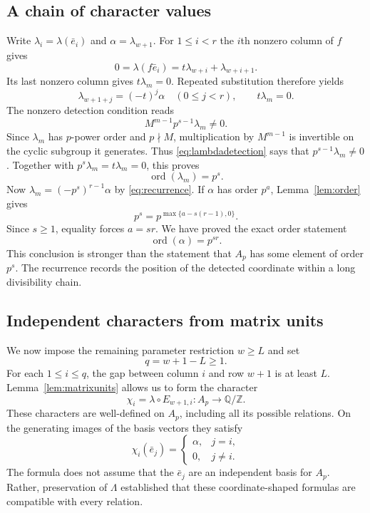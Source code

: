 \documentclass[11pt]{article}
\numberwithin{equation}{section}
\theoremstyle{definition}
\theoremstyle{remark}
\newcommand{\Z}{\mathbb Z}
\newcommand{\Q}{\mathbb Q}
\newcommand{\ord}{\operatorname{ord}}
\begin{document}
\subsection{A chain of character values}
Write $\lambda_i=\lambda(\bar e_i)$ and $\alpha=\lambda_{w+1}$. For $1\le i<r$ the $i$th nonzero column of $f$ gives
\[
0=\lambda(f\bar e_i)=t\lambda_{w+i}+\lambda_{w+i+1}.
\]
Its last nonzero column gives $t\lambda_m=0$. Repeated substitution therefore yields
\begin{equation}\label{eq:recurrence}
\lambda_{w+1+j}=(-t)^j\alpha\quad(0\le j<r),\qquad
t\lambda_m=0.
\end{equation}
The nonzero detection condition reads
\begin{equation}\label{eq:lambdadetection}
M^{m-1}p^{s-1}\lambda_m\ne0.
\end{equation}
Since $\lambda_m$ has $p$-power order and $p\nmid M$, multiplication by $M^{m-1}$ is invertible on the cyclic subgroup it generates. Thus \eqref{eq:lambdadetection} says that $p^{s-1}\lambda_m\ne0$. Together with $p^s\lambda_m=t\lambda_m=0$, this proves
\[
\ord(\lambda_m)=p^s.
\]
Now $\lambda_m=(-p^s)^{r-1}\alpha$ by \eqref{eq:recurrence}. If $\alpha$ has order $p^a$, Lemma~\ref{lem:order} gives
\[
p^s=p^{\max\{a-s(r-1),0\}}.
\]
Since $s\ge1$, equality forces $a=sr$. We have proved the exact order statement
\begin{equation}\label{eq:alphaorder}
\ord(\alpha)=p^{sr}.
\end{equation}
This conclusion is stronger than the statement that $A_p$ has some element of order $p^s$. The recurrence records the position of the detected coordinate within a long divisibility chain.

\subsection{Independent characters from matrix units}
We now impose the remaining parameter restriction $w\ge L$ and set
\begin{equation}\label{eq:q}
q=w+1-L\ge1.
\end{equation}
For each $1\le i\le q$, the gap between column $i$ and row $w+1$ is at least $L$. Lemma~\ref{lem:matrixunits} allows us to form the character
\begin{equation}\label{eq:chii}
\chi_i=\lambda\circ E_{w+1,i}:A_p\longrightarrow\Q/\Z.
\end{equation}
These characters are well-defined on $A_p$, including all its possible relations. On the generating images of the basis vectors they satisfy
\begin{equation}\label{eq:characterscoordinates}
\chi_i(\bar e_j)=
\begin{cases}
\alpha,&j=i,\\
0,&j\ne i.
\end{cases}
\end{equation}
The formula does not assume that the $\bar e_j$ are an independent basis for $A_p$. Rather, preservation of $\Lambda$ established that these coordinate-shaped formulas are compatible with every relation.
\end{document}
